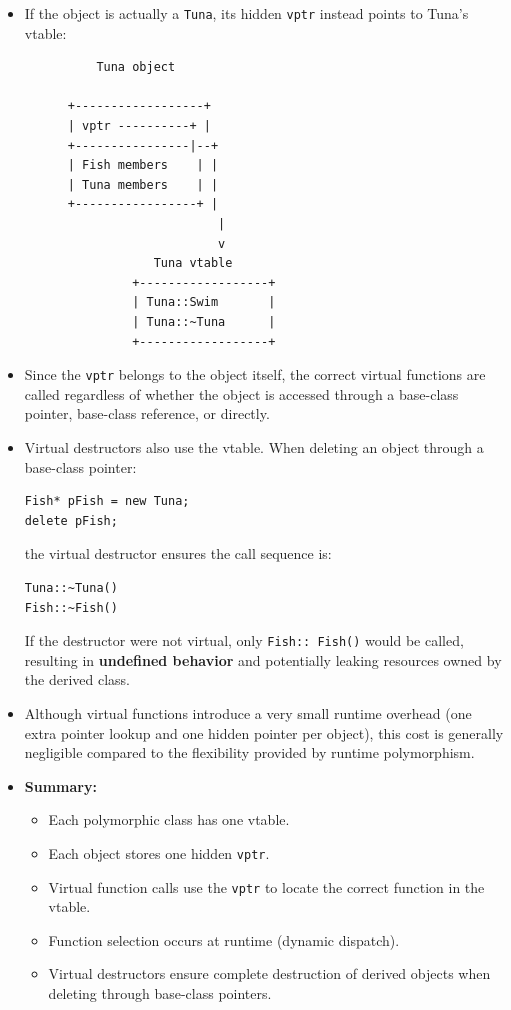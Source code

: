 \documentclass[10pt]{article}
\begin{document}
\begin{itemize}
	\item If the object is actually a \texttt{Tuna}, its hidden \texttt{vptr} instead points to Tuna's vtable:

\begin{verbatim}
          Tuna object

      +------------------+
      | vptr ----------+ |
      +----------------|--+
      | Fish members    | |
      | Tuna members    | |
      +-----------------+ |
                           |
                           v
                  Tuna vtable
               +------------------+
               | Tuna::Swim       |
               | Tuna::~Tuna      |
               +------------------+
\end{verbatim}

	\item Since the \texttt{vptr} belongs to the object itself, the correct virtual functions are called regardless of whether the object is accessed through a base-class pointer, base-class reference, or directly.

	\item Virtual destructors also use the vtable. When deleting an object through a base-class pointer:

\begin{verbatim}
Fish* pFish = new Tuna;
delete pFish;
\end{verbatim}

	the virtual destructor ensures the call sequence is:

\begin{verbatim}
Tuna::~Tuna()
Fish::~Fish()
\end{verbatim}

	If the destructor were not virtual, only \texttt{Fish::~Fish()} would be called, resulting in \textbf{undefined behavior} and potentially leaking resources owned by the derived class.

	\item Although virtual functions introduce a very small runtime overhead (one extra pointer lookup and one hidden pointer per object), this cost is generally negligible compared to the flexibility provided by runtime polymorphism.

	\item \textbf{Summary:}
	\begin{itemize}
		\item Each polymorphic class has one vtable.
		\item Each object stores one hidden \texttt{vptr}.
		\item Virtual function calls use the \texttt{vptr} to locate the correct function in the vtable.
		\item Function selection occurs at runtime (dynamic dispatch).
		\item Virtual destructors ensure complete destruction of derived objects when deleting through base-class pointers.
	\end{itemize}
\end{itemize}
\end{document}
